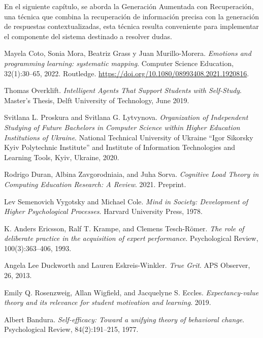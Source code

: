\documentclass{article}
\begin{document}
En el siguiente capítulo, se aborda la Generación Aumentada con Recuperación, una técnica que combina la recuperación de información precisa con la generación de respuestas contextualizadas, esta técnica resulta conveniente para implementar el componente del sistema destinado a resolver dudas.

\begin{thebibliography}{99}

Mayela Coto, Sonia Mora, Beatriz Grass y Juan Murillo-Morera. 
\textit{Emotions and programming learning: systematic mapping}. 
Computer Science Education, 32(1):30--65, 2022. 
Routledge. 
\url{https://doi.org/10.1080/08993408.2021.1920816}.

Thomas Overklift. 
\textit{Intelligent Agents That Support Students with Self-Study}. 
Master's Thesis, Delft University of Technology, June 2019.

Svitlana L. Proskura and Svitlana G. Lytvynova. 
\textit{Organization of Independent Studying of Future Bachelors in Computer Science within Higher Education Institutions of Ukraine}. 
National Technical University of Ukraine “Igor Sikorsky Kyiv Polytechnic Institute” and Institute of Information Technologies and Learning Tools, Kyiv, Ukraine, 2020.

Rodrigo Duran, Albina Zavgorodniaia, and Juha Sorva.
\textit{Cognitive Load Theory in Computing Education Research: A Review}.
2021. Preprint.

Lev Semenovich Vygotsky and Michael Cole.
\textit{Mind in Society: Development of Higher Psychological Processes}.
Harvard University Press, 1978.

K. Anders Ericsson, Ralf T. Krampe, and Clemens Tesch-R{\"o}mer.
\textit{The role of deliberate practice in the acquisition of expert performance}.
Psychological Review, 100(3):363--406, 1993.

Angela Lee Duckworth and Lauren Eskreis-Winkler.
\textit{True Grit}.
APS Observer, 26, 2013.

Emily Q. Rosenzweig, Allan Wigfield, and Jacquelyne S. Eccles.
\textit{Expectancy-value theory and its relevance for student motivation and learning}.
2019.

Albert Bandura.
\textit{Self-efficacy: Toward a unifying theory of behavioral change}.
Psychological Review, 84(2):191--215, 1977.


\end{thebibliography}
\end{document}
